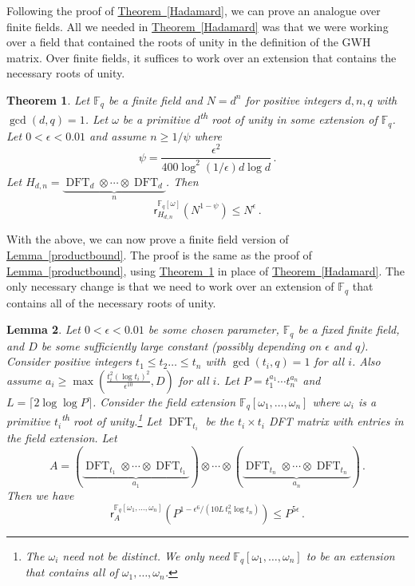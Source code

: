 \documentclass[11pt]{article}
\numberwithin{equation}{section}
\newtheorem{theorem}{Theorem}[section]
\newtheorem{lemma}[theorem]{Lemma}
\theoremstyle{definition}
\theoremstyle{plain}
\newcommand{\expref}[2]{\hyperref[#2]{#1~\ref{#2}}}
\theoremstyle{definition}
\newcommand\F{{\mathbb{F}}}
\newcommand{\ts}{\textsuperscript}
\DeclareMathOperator{\DFT}{DFT}
\begin{document}
Following the proof of \expref{Theorem}{Hadamard}, we can prove an analogue over finite fields.  All we needed in \expref{Theorem}{Hadamard} was that we were working over a field that contained the roots of unity in the definition of the GWH matrix.  Over finite fields, it suffices to work over an extension that contains the necessary roots of unity. 

\begin{theorem} \label{Hadamard_finitefield}
Let $\F_q$ be a finite field and $N = d^n$ for positive integers $d,n,q$ with $\gcd(d,q) = 1$.  Let $\omega$ be a primitive $d$\ts{th} root of unity in some extension of $\F_q$.  Let $0 < \epsilon < 0.01 $ and assume $n \geq 1/\psi$ where \[\psi = \frac{\epsilon^2 }{400\log^2 (1/\epsilon) d \log d} \,.\]  Let $H_{d,n} = \underbrace{\DFT_d \otimes \cdots \otimes \DFT_d}_{n}$. Then
\[
\textsf{r}_{H_{d,n}}^{\F_q[\omega]}\left(N^{1 - \psi}\right) \leq N^{ \epsilon} \,.
\]
\end{theorem}


With the above, we can now prove a finite field version of \expref{Lemma}{productbound}.  The proof is the same as the proof of \expref{Lemma}{productbound}, using \expref{Theorem}{Hadamard_finitefield} in place of \expref{Theorem}{Hadamard}.  The only necessary change is that we need to work over an extension of $\F_q$ that contains all of the necessary roots of unity. 
\begin{lemma}\label{finitefield_productbound}
Let $0 < \epsilon < 0.01$ be some chosen parameter, $\F_q$ be a fixed finite field, and $D$ be some sufficiently large constant (possibly depending on $\epsilon$ and $q$).  Consider positive integers $t_1 \leq t_2 \dots \leq t_n$ with $\gcd(t_i,q) = 1$ for all $i$.  Also assume $a_i \geq \max\left(\frac{t_i^2(\log t_i)^2}{\epsilon^{10}}, D \right)$ for all $i$.  Let $P = t_1^{a_1} \cdots t_n^{a_n}$ and $L = \lceil2 \log \log P \rceil$.  Consider the field extension $\F_q[\omega_1, \dots , \omega_n]$ where $\omega_i$ is a primitive $t_i$\ts{th} root of unity.\footnote{The $\omega_i$ need not be distinct.  We only need $\F_q[\omega_1, \dots , \omega_n]$ to be an extension that contains all of $\omega_1, \dots , \omega_n$.}  Let %
$\DFT_{t_i}$ %
be the $t_i \times t_i$ %
DFT %
matrix with entries %
in %
the field extension.  Let
%
%
%
 \[
A = (\underbrace{\DFT_{t_1} \otimes \cdots \otimes \DFT_{t_1}}_\text{$a_1$}) \otimes \cdots \otimes  (\underbrace{\DFT_{t_n} \otimes \cdots \otimes \DFT_{t_n}}_\text{$a_n$}) \,.
\]
%
Then we have
\[
\textsf{r}^{\F_q[\omega_1, \dots , \omega_n]}_A\left( P^{1 - \epsilon^6/(10L\,t_n^2 \log t_n)}\right) \leq  P^{5 \epsilon} \,.
\]
\end{lemma}
\end{document}
